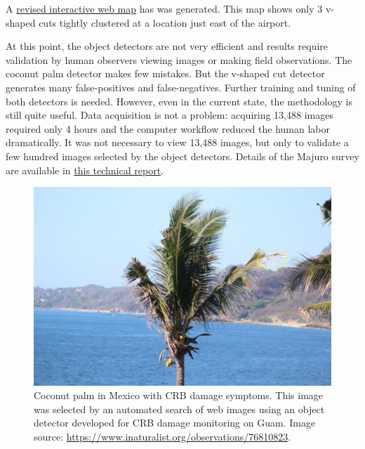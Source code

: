 \documentclass[12pt,letterpaper,english,bibliography=totocnumbered, abstract=on]{scrartcl}
\begin{document}
A \href{https://aubreymoore.github.io/Majuro-CRB-damage-map-1/webmap/#12/7.1082/171.2072}{revised interactive web map} has was generated. This map shows only 3 v-shaped cuts tightly clustered at a location just east of the airport.

At this point, the object detectors are not very efficient and results require validation by human observers viewing images or making field observations. The coconut palm detector makes few mistakes. But the v-shaped cut detector generates many false-positives and false-negatives. Further training and tuning of both detectors is needed. However, even in the current state, the methodology is still quite useful. Data acquisition is not a problem: acquiring 13,488 images required only 4 hours and the computer workflow reduced the human labor dramatically. It was not necessary to view 13,488 images, but only to validate a few hundred images selected by the object detectors. Details of the Majuro survey are available in \href{https://aubreymoore.github.io/Majuro-tech-report-20231201/Majuro-tech-report.pdf}{this technical report}.  

%
%
%

\begin{figure}[H]
	\centering
	\includegraphics[width=\linewidth]{images/crb-mexico}
	\caption{Coconut palm in Mexico with CRB damage symptoms. This image was selected by an automated search of web images using an object detector developed for CRB damage monitoring on Guam. Image source: \url{https://www.inaturalist.org/observations/76810823}.}
	\label{fig:crb-mexico}
\end{figure}
\end{document}
